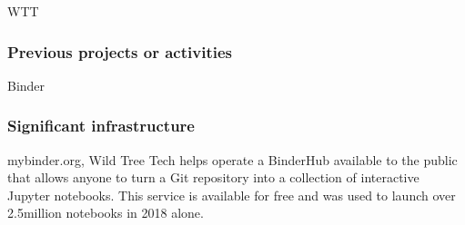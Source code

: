 \begin{sitedescription}{WTT}
\subsubsection*{Previous projects or activities}

\begin{compactenum}
\item Binder
\end{compactenum}

\subsubsection*{Significant infrastructure}
\begin{compactenum}
\item mybinder.org, Wild Tree Tech helps operate a BinderHub available to the public that allows anyone to turn a Git repository into a collection of interactive Jupyter notebooks. This service is available for free and was used to launch over 2.5million notebooks in 2018 alone.
\end{compactenum}

\end{sitedescription}
